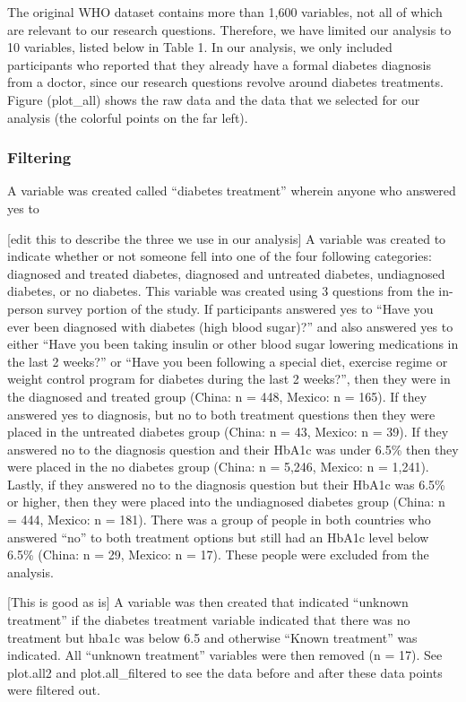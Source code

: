 \documentclass[
  man]{apa6}
\begin{document}
The original WHO dataset contains more than 1,600 variables, not all of which are relevant to our research questions. Therefore, we have limited our analysis to 10 variables, listed below in Table 1. In our analysis, we only included participants who reported that they already have a formal diabetes diagnosis from a doctor, since our research questions revolve around diabetes treatments. Figure (plot\_all) shows the raw data and the data that we selected for our analysis (the colorful points on the far left).

\hypertarget{filtering}{%
\subsubsection{Filtering}\label{filtering}}

A variable was created called ``diabetes treatment'' wherein anyone who answered yes to

{[}edit this to describe the three we use in our analysis{]}
A variable was created to indicate whether or not someone fell into one of the four following categories: diagnosed and treated diabetes, diagnosed and untreated diabetes, undiagnosed diabetes, or no diabetes. This variable was created using 3 questions from the in-person survey portion of the study. If participants answered yes to ``Have you ever been diagnosed with diabetes (high blood sugar)?'' and also answered yes to either ``Have you been taking insulin or other blood sugar lowering medications in the last 2 weeks?'' or ``Have you been following a special diet, exercise regime or weight control program for diabetes during the last 2 weeks?'', then they were in the diagnosed and treated group (China: n = 448, Mexico: n = 165). If they answered yes to diagnosis, but no to both treatment questions then they were placed in the untreated diabetes group (China: n = 43, Mexico: n = 39). If they answered no to the diagnosis question and their HbA1c was under 6.5\% then they were placed in the no diabetes group (China: n = 5,246, Mexico: n = 1,241). Lastly, if they answered no to the diagnosis question but their HbA1c was 6.5\% or higher, then they were placed into the undiagnosed diabetes group (China: n = 444, Mexico: n = 181). There was a group of people in both countries who answered ``no'' to both treatment options but still had an HbA1c level below 6.5\% (China: n = 29, Mexico: n = 17). These people were excluded from the analysis.

{[}This is good as is{]}
A variable was then created that indicated ``unknown treatment'' if the diabetes treatment variable indicated that there was no treatment but hba1c was below 6.5 and otherwise ``Known treatment'' was indicated. All ``unknown treatment'' variables were then removed (n = 17). See plot.all2 and plot.all\_filtered to see the data before and after these data points were filtered out.
\end{document}
